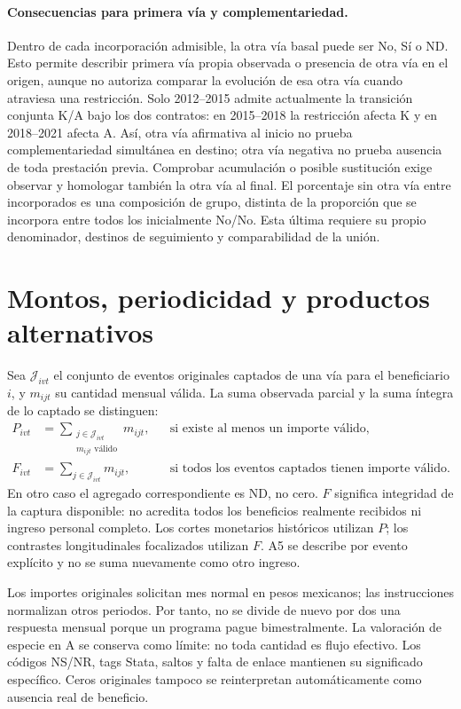 \paragraph{Consecuencias para primera vía y complementariedad.}
Dentro de cada incorporación admisible, la otra vía basal puede ser
No, Sí o ND. Esto permite describir primera vía propia observada o presencia
de otra vía en el origen, aunque no autoriza comparar la evolución de esa
otra vía cuando atraviesa una restricción. Solo 2012--2015 admite actualmente
la transición conjunta K/A bajo los dos contratos: en 2015--2018 la
restricción afecta K y en 2018--2021 afecta A.
Así, otra vía afirmativa al inicio no prueba complementariedad simultánea
en destino; otra vía negativa no prueba ausencia de toda prestación previa.
Comprobar acumulación o posible sustitución exige observar y homologar
también la otra vía al final. El porcentaje sin otra vía entre incorporados
es una composición de grupo, distinta de la proporción que se incorpora
entre todos los inicialmente No/No. Esta última requiere su propio
denominador, destinos de seguimiento y comparabilidad de la unión.

\section{Montos, periodicidad y productos alternativos}

Sea $\mathcal J_{ivt}$ el conjunto de eventos originales captados de una
vía para el beneficiario $i$, y $m_{ijt}$ su cantidad mensual válida. La suma
observada parcial y la suma íntegra de lo captado se distinguen:
\begin{align}
 P_{ivt}&=\sum_{\substack{j\in\mathcal J_{ivt}\\m_{ijt}\text{ válido}}}m_{ijt},
 &&\text{si existe al menos un importe válido}, \label{eq:monto-parcial}\\
 F_{ivt}&=\sum_{j\in\mathcal J_{ivt}}m_{ijt},
 &&\text{si todos los eventos captados tienen importe válido}. \label{eq:monto-integro}
\end{align}
En otro caso el agregado correspondiente es ND, no cero. $F$ significa
integridad de la captura disponible: no acredita todos los beneficios
realmente recibidos ni ingreso personal completo. Los cortes monetarios históricos utilizan $P$; los contrastes longitudinales
focalizados utilizan $F$.
A5 se describe por evento explícito y no se suma nuevamente como otro
ingreso.

Los importes originales solicitan mes normal en pesos mexicanos; las
instrucciones normalizan otros periodos. Por tanto, no se divide de nuevo
por dos una respuesta mensual porque un programa pague bimestralmente.
La valoración de especie en A se conserva como límite: no toda cantidad
es flujo efectivo. Los códigos NS/NR, tags Stata, saltos y falta de enlace
mantienen su significado específico. Ceros originales tampoco se reinterpretan
automáticamente como ausencia real de beneficio.

